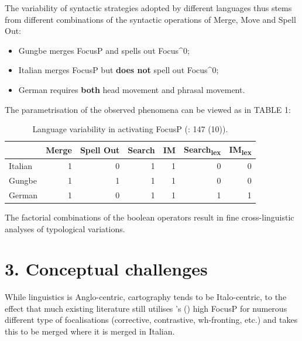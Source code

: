 \documentclass[fleqn,10pt]{wlscirep}
\begin{document}
\noindent The variability of syntactic strategies adopted by different languages thus stems from different combinations of the syntactic operations of Merge, Move and Spell Out: 

\begin{itemize}
\item[\ding{227}] Gungbe merges FocusP and spells out Focus^0; 
\item[\ding{227}] \vspace*{-2mm} Italian merges FocusP but \textbf{does not} spell out Focus^0; 
\item[\ding{227}] \vspace*{-2mm} German requires \textbf{both} head movement and phrasal movement. 
\end{itemize}

    \noindent The parametrisation of the observed phenomena can be viewed as in TABLE 1:

\begin{table}[H]
    \centering
    \begin{tabular}{|l|r|r|r|r|r|r|}
    \hline
     & Merge & Spell Out & Search & IM & Search\textsubscript{lex} & IM\textsubscript{lex} \\
    \hline
    Italian & 1 & 0 & 1 & 1 & 0 & 0 \\
    \hline
    Gungbe & 1 & 1 & 1 & 1 & 0 & 0 \\
    \hline
    German & 1 & 0 & 1 & 1 & 1 & 1 \\
    \hline
    \end{tabular}
    \caption{\label{tab:samp}Language variability in activating FocusP (\citealt{samo2019cartography}: 147 (10)).}
    \end{table}

\noindent The factorial combinations of the boolean operators result in fine cross-linguistic analyses of typological variations.

\section*{3. Conceptual challenges}

While linguistics is Anglo-centric, cartography tends to be Italo-centric, to the effect that much existing literature still utilises \citeauthor{rizzi1997fine}'s (\citeyear{rizzi1997fine}) high FocusP for numerous different type of focalisations (corrective, contrastive, wh-fronting, etc.) and takes this to be merged where it is merged in Italian. 
\end{document}
